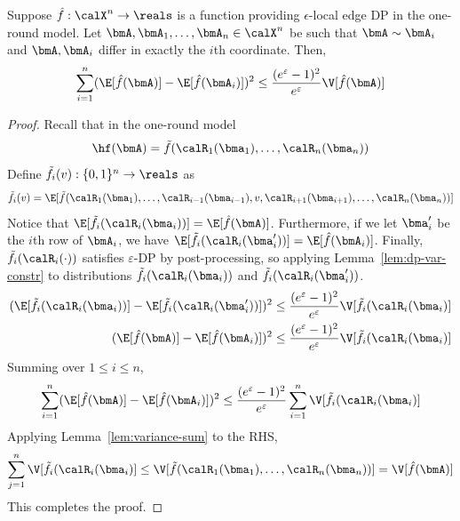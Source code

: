 \begin{lemma}\label{lem:var-to-inf}
Suppose $\hat{f} : \calX^n \rightarrow \reals$ is 
a function providing $\epsilon$-local edge DP in the one-round model. Let $\bmA,\bmA_1,\ldots,
\bmA_n \in \calX^{n}$ be such that $\bmA \sim \bmA_i$ and $\bmA, \bmA_i$ differ
in exactly the $i$th coordinate. Then,
\begin{equation*}
    \sum_{i=1}^n (\E[\hat{f}(\bmA)] - \E[\hat{f}(\bmA_i)])^2 \leq \frac{(e^\varepsilon-1)^2}{e^\varepsilon}\V[\hat{f}(\bmA)]
\end{equation*}

\end{lemma} 
\begin{proof}

Recall that in the one-round model
\[
  \hf(\bmA) = \tilde{f}(\calR_1(\bma_1),\ldots, \calR_n(\bma_n))
\]
Define $\tilde{f}_i(v) : \{0,1\}^n \rightarrow \reals$ as
\[
    \tilde{f}_i(v) = \E[\tilde{f}(\calR_1(\bma_1),\ldots,
    \calR_{i-1}(\bma_{i-1}), v, \calR_{i+1}(\bma_{i+1}), \ldots, \calR_n(\bma_n))]
\]
Notice that $\E[\tilde{f}_i(\calR_i(\bma_i))] = \E[\hat{f}(\bmA)]$. Furthermore,
if we let $\bma_i'$ be the $i$th row of $\bmA_i$, we have
$\E[\tilde{f}_i(\calR_i(\bma_i'))] = \E[\hat{f}(\bmA_i)]$. Finally,
$\tilde{f}_i(\calR_i(\cdot))$ satisfies $\varepsilon$-DP by post-processing, so
applying Lemma~\ref{lem:dp-var-constr} to distributions
$\tilde{f}_i(\calR_i(\bma_i))$ and $\tilde{f}_i(\calR_i(\bma_i'))$.
\begin{align*}
  (\E[\tilde{f}_i(\calR_i(\bma_i))] - \E[\tilde{f}_i(\calR_i(\bma_i'))])^2 
  &\leq \frac{(e^\varepsilon -
  1)^2}{e^\varepsilon} \V[\tilde{f}_i(\calR_i(\bma_i)] \\
  (\E[\hat{f}(\bmA)] - \E[\hat{f}(\bmA_i)])^2 &\leq \frac{(e^\varepsilon -
  1)^2}{e^\varepsilon} \V[\tilde{f}_i(\calR_i(\bma_i)]
\end{align*}
Summing over $1 \leq i \leq n$,
\begin{align*}
\sum_{i=1}^n (\E[\hat{f}(\bmA)] - \E[\hat{f}(\bmA_i)])^2 \leq 
  \frac{(e^\varepsilon - 1)^2}{e^\varepsilon} \sum_{i=1}^n
  \V[\tilde{f}_i(\calR_i(\bma_i)] 
\end{align*}
Applying Lemma~\ref{lem:variance-sum} to the RHS,
\begin{align*}
    \sum_{j=1}^n \V[\tilde{f}_i(\calR_i(\bma_i)] \leq
      \V[\tilde{f}(\calR_1(\bma_1), \ldots, \calR_n(\bma_n))] = \V[\hat{f}(\bmA)]
\end{align*}
This completes the proof.
\end{proof}

